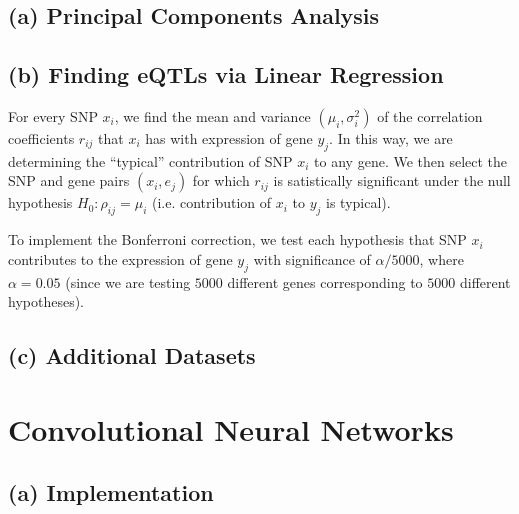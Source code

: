 \documentclass{article}[11pt]
\begin{document}
\subsection*{(a) Principal Components Analysis}

\subsection*{(b) Finding eQTLs via Linear Regression}
For every SNP $x_i$, we find the mean and variance
$(\mu_{i}, \sigma_{i}^2)$ of the correlation coefficients $r_{ij}$ that 
$x_i$ has with expression of gene $y_j$. In this way, we are determining
the ``typical'' contribution of SNP $x_i$ to any gene.
We then select the SNP and gene pairs $(x_i, e_j)$ for which
$r_{ij}$ is satistically significant
under the null hypothesis $H_0: \rho_{ij} = \mu_{i}$ (i.e. contribution
of $x_i$ to $y_j$ is typical).

To implement the Bonferroni correction, we test
each hypothesis that SNP $x_i$ contributes
to the expression of gene $y_j$ with significance
of $\alpha / 5000$, where $\alpha = 0.05$ (since we are testing
$5000$ different genes corresponding to $5000$ different hypotheses).

\subsection*{(c) Additional Datasets}

\section{Convolutional Neural Networks}
\subsection*{(a) Implementation}
\end{document}
